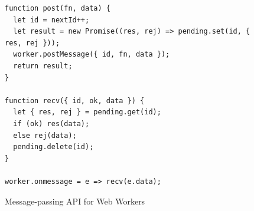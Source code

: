 \begin{figure}[H]
\centering
\begin{verbatim}
function post(fn, data) {
  let id = nextId++;
  let result = new Promise((res, rej) => pending.set(id, { res, rej }));
  worker.postMessage({ id, fn, data });
  return result;
}

function recv({ id, ok, data }) {
  let { res, rej } = pending.get(id);
  if (ok) res(data);
  else rej(data);
  pending.delete(id);
}

worker.onmessage = e => recv(e.data);
\end{verbatim}
\caption{Message-passing API for Web Workers}
\label{fig:web-worker}
\end{figure}